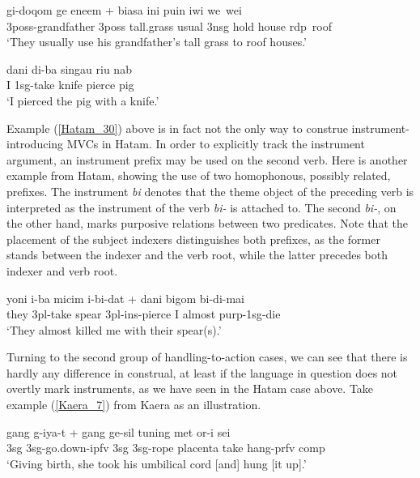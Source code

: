 \ea \label{Klon_87}
\gll gi-doqom ge eneem + biasa ini puin iwi we~wei \\
3\acs{poss}-grandfather 3\acs{poss} tall.grass usual 3\acs{nsg} hold house \acs{rdp}~roof \\
\glft `They usually use his grandfather's tall grass to roof houses.' \\ 
\z
\xe

\ea \label{Hatam_30}
\gll dani di-ba singau riu nab \\
I 1\acs{sg}-take knife pierce pig \\
\glft `I pierced the pig with a knife.' \\ 
\z
\xe

Example (\ref{Hatam_30}) above is in fact not the only way to construe instrument-introducing MVCs in Hatam. In order to explicitly track the instrument argument, an instrument prefix may be used on the second verb. Here is another example from Hatam, showing the use of two homophonous, possibly related, prefixes. The instrument \textit{bi} denotes that the theme object of the preceding verb is interpreted as the instrument of the verb \textit{bi-} is attached to. The second \textit{bi-}, on the other hand, marks purposive relations between two predicates. Note that the placement of the subject indexers distinguishes both prefixes, as the former stands between the indexer and the verb root, while the latter precedes both indexer and verb root.

\ea \label{}
\gll yoni i-ba micim i-bi-dat + dani bigom bi-di-mai \\
they 3\acs{pl}-take spear 3\acs{pl}-\acs{ins}-pierce I almost \acs{purp}-1\acs{sg}-die \\
\glft `They almost killed me with their spear(s).' \\ 
\z
\xe

Turning to the second group of handling-to-action cases, we can see that there is hardly any difference in construal, at least if the language in question does not overtly mark instruments, as we have seen in the Hatam case above. Take example (\ref{Kaera_7}) from Kaera as an illustration.

\ea \label{Kaera_7}
\gll gang g-iya-t + gang ge-sil tuning met or-i sei \\
3\acs{sg} 3\acs{sg}-go.down-\acs{ipfv} 3\acs{sg} 3\acs{sg}-rope placenta take hang-\acs{prfv} \acs{comp} \\
\glft `Giving birth, she took his umbilical cord [and] hung [it up].' \\ 
\z
\xe

